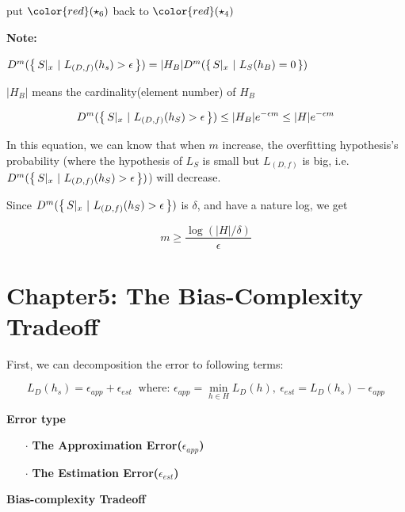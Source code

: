 put $\color{red}(\star_6)$ back to $\color{red}(\star_4)$ 

\begin{tcolorbox}
	\textbf{Note:}
	
	
	$D^m(\left\{ \,S|_x ~|~L_{(D,f)}(h_s)>\epsilon \,\right\}) = |H_B|D^m(\left\{ \,{S|_x ~|~L_S(h_B)=0} \,\right\})$
	
	$|H_B|$ means the cardinality(element number) of $H_B$
\end{tcolorbox}

$$D^m(\left\{ \,S|_x ~|~ L_{(D,f)}(h_S)>\epsilon \,\right\}) \leq |H_B|e^{-\epsilon m} \leq |H|e^{-\epsilon m}$$

In this equation, we can know that when $m$ increase, the  overfitting hypothesis's probability (where the hypothesis of $L_S$ is small but $L_{(D,f)}$ is big, i.e. $D^m(\left\{ \,S|_x ~|~ L_{(D,f)}(h_S)>\epsilon \,\right\})$) will decrease.

Since $D^m(\left\{ \,S|_x ~|~ L_{(D,f)}(h_S)>\epsilon \,\right\})$ is $\delta$, and have a nature log, we get

$$m \geq \dfrac{\log(|H|/\delta)}{\epsilon}$$






\newpage


\section*{Chapter5: The Bias-Complexity Tradeoff}

First, we can decomposition the error to following terms:

$$L_D(h_s) = \epsilon_{app} + \epsilon_{est} ~\text{ where: } \epsilon_{app} = \min_{h \in H}L_D(h),~\epsilon_{est} = L_D(h_s) - \epsilon_{app}$$


\textbf{Error type}
\begin{enumerate}
	\item[$\cdot$] \textbf{The Approximation Error($\epsilon_{app}$)}
	\item[$\cdot$] \textbf{The Estimation Error($\epsilon_{est}$)}
\end{enumerate}

\textbf{Bias-complexity Tradeoff}












